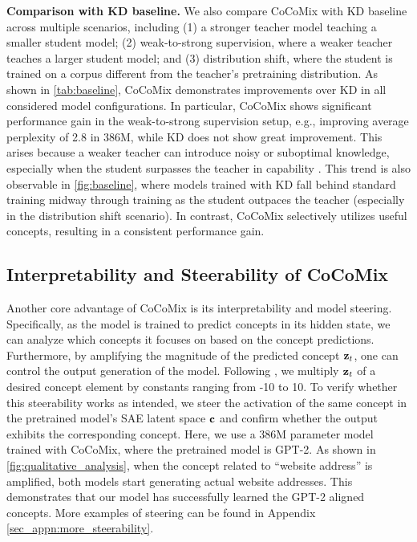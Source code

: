 \documentclass[]{fairmeta}
\newcommand{\sname}{CoCoMix\xspace}
\begin{document}
\textbf{Comparison with KD baseline.} We also compare \sname with KD baseline across multiple scenarios, including (1) a stronger teacher model teaching a smaller student model; (2) weak-to-strong supervision, where a weaker teacher teaches a larger student model; and (3) distribution shift, where the student is trained on a corpus different from the teacher’s pretraining distribution. As shown in \autoref{tab:baseline}, \sname demonstrates improvements over KD in all considered model configurations. In particular, \sname shows significant performance gain in the weak-to-strong supervision setup, e.g., improving average perplexity of 2.8 in 386M, while KD does not show great improvement. This arises because a weaker teacher can introduce noisy or suboptimal knowledge, especially when the student surpasses the teacher in capability \citep{rawat2024little}. This trend is also observable in \autoref{fig:baseline}, where models trained with KD fall behind standard training midway through training as the student outpaces the teacher (especially in the distribution shift scenario). In contrast, \sname selectively utilizes useful concepts, resulting in a consistent performance gain.







\subsection{Interpretability and Steerability of \sname}
Another core advantage of \sname is its interpretability and model steering. Specifically, as the model is trained to predict concepts in its hidden state, we can analyze which concepts it focuses on based on the concept predictions. Furthermore, by amplifying the magnitude of the predicted concept ${\mathbf{z}}_t$, one can control the output generation of the model. Following \citet{templeton2024scaling}, we multiply ${\mathbf{z}}_t$ of a desired concept element by constants ranging from -10 to 10. To verify whether this steerability works as intended, we steer the activation of the same concept in the pretrained model's SAE latent space ${\mathbf{c}}$ and confirm whether the output exhibits the corresponding concept. Here, we use a 386M parameter model trained with \sname, where the pretrained model is GPT-2. As shown in \autoref{fig:qualitative_analysis}, when the concept related to ``website address'' is amplified, both models start generating actual website addresses. This demonstrates that our model has successfully learned the GPT-2 aligned concepts. More examples of steering can be found in Appendix \ref{sec_appn:more_steerability}.
\end{document}
